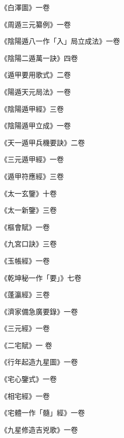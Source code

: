 \begin{pinyinscope}
 《白澤圖》一卷



 《周遁三元纂例》一卷



 《陰陽遁八一作「入」局立成法》一卷



 《陰陽二遁萬一訣》四卷



 《遁甲要用歌式》二卷



 《陽遁天元局法》一卷



 《陰陽遁甲經》三卷



 《陰陽遁甲立成》一卷



 《天一遁甲兵機要訣》二卷



 《三元遁甲經》一卷



 《遁甲符應經》三卷



 《太一玄鑒》十卷



 《太一新鑒》三卷



 《樞會賦》一卷



 《九宮口訣》三卷



 《玉帳經》一卷



 《乾坤秘一作「要」》七卷



 《蓬瀛經》三卷



 《濟家備急廣要錄》一卷



 《三元經》一卷



 《二宅賦》一
 卷



 《行年起造九星圖》一卷



 《宅心鑒式》一卷



 《相宅經》一卷



 《宅體一作「髓」經》一卷



 《九星修造吉兇歌》一卷




\end{pinyinscope}
